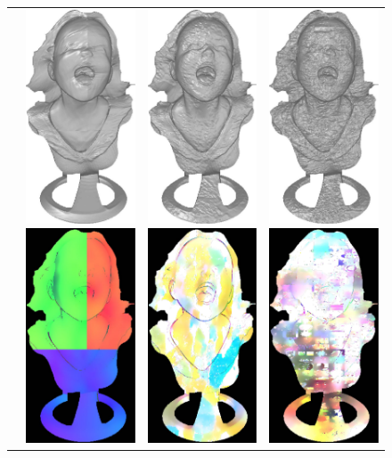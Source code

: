 \begin{figure}
{\begin{tabular}{cccc}
\multirow{-15}{*}{\parbox[t]{2.5mm}{}} &
 \includegraphics[height=0.25\linewidth]{figures/result/comp_fusion_rgbN_shape.pdf}
 \includegraphics[height=0.25\linewidth]{figures/result/comp_fusion_rgbN_albedo.pdf} &
 \includegraphics[height=0.25\linewidth]{figures/result/comp_fusion_patternN_shape.pdf} 
\includegraphics[height=0.25\linewidth]{figures/result/comp_fusion_patternN_albedo.pdf} &
\includegraphics[height=0.25\linewidth]{figures/result/comp_fusion_loveN_shape.pdf} 
\includegraphics[height=0.25\linewidth]{figures/result/comp_fusion_loveN_albedo.pdf} \\

\end{tabular}}
\end{figure}
